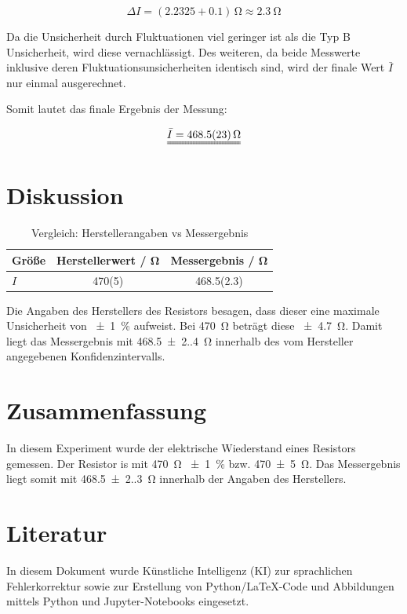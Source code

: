 \documentclass{protokoll}
\begin{document}
\begin{equation*}
    \Delta I = (\num{2.2325} + \num{0.1})\,\unit\ohm \approx \qty{2.3}{\ohm}
\end{equation*}

Da die Unsicherheit durch Fluktuationen viel geringer ist als die Typ B
Unsicherheit, wird diese vernachlässigt. Des weiteren, da beide Messwerte
inklusive deren Fluktuationsunsicherheiten identisch sind, wird der finale Wert
$\bar{I}$ nur einmal ausgerechnet.

Somit lautet das finale Ergebnis der Messung:

\begin{equation*}
    \uuline{\bar{I} = \qty{468.5(2.3)}{\ohm}}
\end{equation*}

\section{Diskussion}

\begin{table}[H]
    \centering
    \begin{tabular}{| l | S | S |}
        \hline
        Größe & {Herstellerwert / \unit\ohm} & {Messergebnis / \unit\ohm} \\
        \hline\hline
        $I$ & 470(5) & 468.5(2.3) \\
        \hline
    \end{tabular}
    \caption{Vergleich: Herstellerangaben vs Messergebnis}
    \label{tab:comparison}
\end{table}

Die Angaben des Herstellers des Resistors besagen, dass dieser eine maximale
Unsicherheit von \qty{+-1}{\percent} aufweist. Bei \qty{470}{\ohm} beträgt diese
\qty{+-4.7}{\ohm}. Damit liegt das Messergebnis mit \qty{468.5(2.4)}{\ohm}
innerhalb des vom Hersteller angegebenen Konfidenzintervalls.

\section{Zusammenfassung}

In diesem Experiment wurde der elektrische Wiederstand eines Resistors gemessen.
Der Resistor is mit \qty{470}{\ohm} \qty{+-1}{\percent} bzw. \qty{470(5)}{\ohm}.
Das Messergebnis liegt somit mit \qty{468.5(2.3)}{\ohm} innerhalb der Angaben
des Herstellers.

\pagebreak
\section{Literatur}

\nocite{*}
\printbibliography
In diesem Dokument wurde Künstliche Intelligenz (KI) zur sprachlichen Fehlerkorrektur sowie zur
Erstellung von Python/LaTeX-Code und Abbildungen mittels Python und Jupyter-Notebooks eingesetzt.
\end{document}
